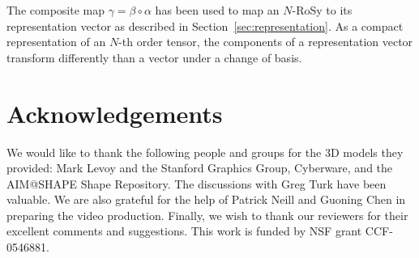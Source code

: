 \documentclass{acmsiggraph}               %
\begin{document}
The composite map $\gamma = \beta \circ \alpha$ has been used to map
an $N$-RoSy to its representation vector as described in
Section~\ref{sec:representation}. As a compact representation of an
$N$-th order tensor, the components of a representation vector
transform differently than a vector under a change of basis.

\section*{Acknowledgements}

We would like to thank the following people and groups for the 3D
models they provided: Mark Levoy and the Stanford Graphics Group,
Cyberware, and the AIM@SHAPE Shape Repository. The discussions with
Greg Turk have been valuable. We are also grateful for the help of
Patrick Neill and Guoning Chen in preparing the video production.
Finally, we wish to thank our reviewers for their excellent comments
and suggestions. This work is funded by NSF grant CCF-0546881.




\nocite{*}

\end{document}
